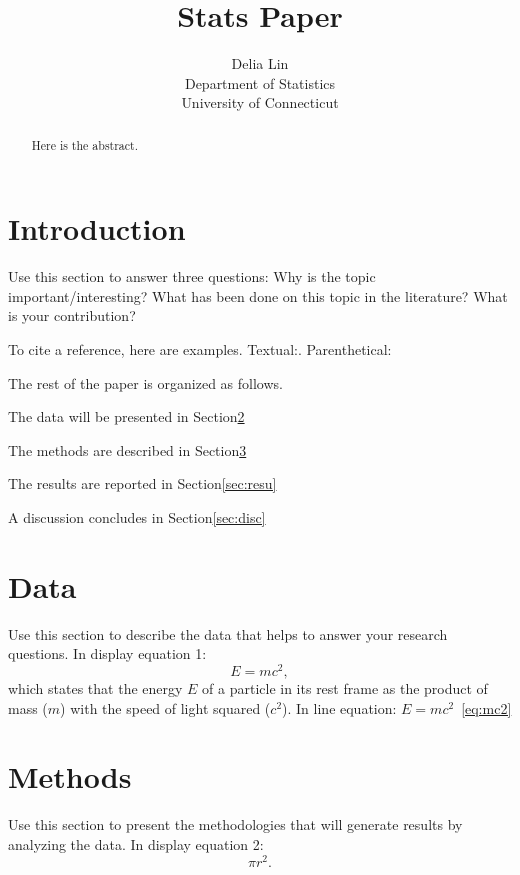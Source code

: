 \documentclass[12pt]{article}
\title{Stats Paper}
\author{Delia Lin\\
  Department of Statistics\\
  University of Connecticut
}
\begin{document}
\maketitle


\begin{abstract}
Here is the abstract.  
\end{abstract}


\section{Introduction}\label{sec:intro}

Use this section to answer three questions:
Why is the topic important/interesting?
What has been done on this topic in the literature?
What is your contribution?

\lipsum[1]

To cite a reference, here are examples. Textual:\citet{dwivedi2017analysis}. Parenthetical:\citep{xie2015dynamic}
\lipsum[2]

The rest of the paper is organized as follows.

The data will be presented in Section\ref{sec:data}

The methods are described in Section\ref{sec:meth}

The results are reported in Section\ref{sec:resu}

A discussion concludes in Section\ref{sec:disc}


\section{Data}\label{sec:data}

Use this section to describe the data that helps to answer your research
questions. In display equation 1:
\begin{equation}\label{eq:mc2} 
  E = m c^2,
\end{equation}
which states that the energy $E$ of a particle in its rest frame as the product
of mass ($m$) with the speed of light squared ($c^2$). In line equation: $E=m c^2$~\ref{eq:mc2}

\section{Methods}\label{sec:meth}

Use this section to present the methodologies that will generate results by
analyzing the data. In display equation 2: 
\begin{equation}
  \label{eq:area}
  \pi r^2.
\end{equation}
\end{document}
